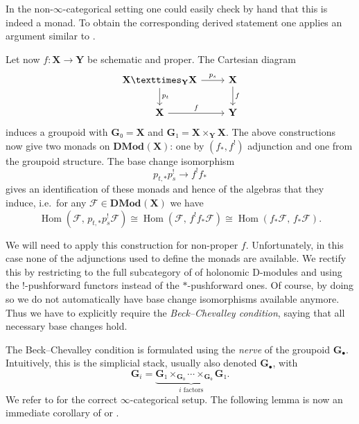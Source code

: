 \documentclass{oupau}
\theoremstyle{remark}
\let\stack\mathbf                           %
\newcommand\cat{\mathbf}                    %
\DeclareMathOperator\Hom{Hom}
\newcommand\cx\bullet                       %
\newcommand\sheaf\mathcal
\newcommand\catDMod[2][]{\cat{DMod}_{#1}(#2)}   %
\begin{document}
In the non-$∞$-categorical setting one could easily check by hand that this is indeed a monad.
To obtain the corresponding derived statement one applies an argument similar to \cite[Section~4.7.2]{GaitsgoryRozenblyum:2017:StudyInDAG:1}.

Let now $f\colon \stack X → \stack Y$ be schematic and proper.
The Cartesian diagram
\[
    \begin{tikzcd}
        \stack X ×_{\stack Y} \stack X \arrow[r, "p_s"] \arrow[d, "p_t"] & \stack X \arrow[d, "f"] \\
        \stack X \arrow[r, "f"] & \stack Y
    \end{tikzcd}
\]
induces a groupoid with $\stack{G}₀ = \stack X$ and $\stack{G}₁ = \stack X ×_{\stack Y} \stack X$.
The above constructions now give two monads on $\catDMod{\stack{X}}$: one by $(f_*,f^!)$ adjunction and one from the groupoid structure.
The base change isomorphism
\[
    p_{t,*} p_s^! → f^! f_*
\]
gives an identification of these monads and hence of the algebras that they induce, i.e.~for any $\sheaf F ∈ \catDMod{\stack X}$ we have
\[
    \Hom(\sheaf F,\, p_{t,*} p_s^!\sheaf F) \cong
    \Hom(\sheaf F,\, f^! f_* \sheaf F) \cong
    \Hom(f_*\sheaf F,\, f_* \sheaf F).
\]

We will need to apply this construction for non-proper $f$.
Unfortunately, in this case none of the adjunctions used to define the monads are available.
We rectify this by restricting to the full subcategory of of holonomic D-modules and using the $!$-pushforward functors instead of the $*$-pushforward ones.
Of course, by doing so we do not automatically have base change isomorphisms available anymore.
Thus we have to explicitly require the \emph{Beck--Chevalley condition}, saying that all necessary base changes hold.

The Beck--Chevalley condition is formulated using the \emph{nerve} of the groupoid $\stack G_\cx$.
Intuitively, this is the simplicial stack, usually also denoted $\stack{G}_\cx$, with
\[
    \stack G_i = \underbrace{\stack G₁ ×_{\stack G₀} \dotsb ×_{\stack G₀} \stack G₁}_{\text{$i$ factors}}.
\]
We refer to \cite[Section~6.1.2]{Lurie:2009:HigherToposTheory} for the correct $∞$-categorical setup.
The following lemma is now an immediate corollary of \cite[Lemma~4.7.1.4]{GaitsgoryRozenblyum:2017:StudyInDAG:2} or \cite[Theorem~4.7.5.2]{Lurie:2017-draft:HigherAlgebra}.
\end{document}
